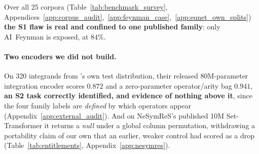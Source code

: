 Over all 25 corpora (Table~\ref{tab:benchmark_survey}, Appendices~\ref{app:corpus_audit},~\ref{app:feynman_case},~\ref{app:eqnet_own_splits}) \textbf{the S1 flaw is real and confined to one published family}: only AI~Feynman \citep{udrescu2020ai} is exposed, at $84\%$.

\paragraph{Two encoders we did not build.} On 320 integrands from \citet{lample2019deep}'s own test distribution, their released 80M-parameter integration encoder scores $0.872$ and a zero-parameter operator/arity bag $\mathbf{0.941}$, \textbf{an S2 task correctly identified, and evidence of nothing above it}, since the four family labels are \emph{defined} by which operators appear (Appendix~\ref{app:external_audit}). And on NeSymReS's published 10M Set-Transformer it returns a \emph{null} under a global column permutation, withdrawing a portability claim of our own that an earlier, weaker control had scored as a drop (Table~\ref{tab:entitlements}, Appendix~\ref{app:nesymres}).

